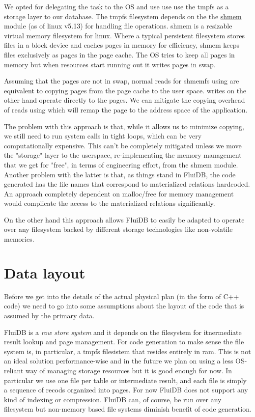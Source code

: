 We opted for delegating the task to the OS and use use use the tmpfs
as a storage layer to our database. The tmpfs filesystem depends on
the the
\href{https://elixir.bootlin.com/linux/latest/source/mm/shmem.c}{shmem}
module (as of linux v5.13) for handling file operations. shmem is a
resizable virtual memory filesystem for linux. Where a typical
persistent filesystem stores files in a block device and caches pages
in memory for efficiency, shmem keeps files exclusively as pages in
the page cache. The OS tries to keep all pages in memory but when
resources start running out it writes pages in swap.

Assuming that the pages are not in swap, normal reads for shmemfs
using  are equivalent to copying pages from the page cache to
the user space.  writes on the other hand operate directly to
the pages. We can mitigate the copying overhead of reads using 
which will remap the page to the address space of the application.

The problem with this approach is that, while it allows us to minimize
copying, we still need to run system calls in tight loops, which can
be very computationally expensive. This can't be completely mitigated
unless we move the "storage" layer to the userspace, re-implementing
the memory management that we get for "free", in terms of engineering
effort, from the shmem module. Another problem with the latter is
that, as things stand in FluiDB, the code generated has the file names
that correspond to materialized relations hardcoded. An approach
completely dependent on malloc/free for memory management would
complicate the access to the materialized relations significantly.

On the other hand this approach allows FluiDB to easily be adapted to
operate over any filesystem backed by different storage technologies
like non-volatile memories.

\section{Data layout}

Before we get into the details of the actual physical plan (in the
form of C++ code) we need to go into some assumptions about the layout
of the code that is assumed by the primary data.

FluiDB is a \emph{row store system} and it depends on the filesystem for
itnermediate result lookup and page management. For code generation to
make sense the file system is, in particular, a tmpfs filesistem that
resides entirely in ram. This is not an ideal solution
performance-wise and in the future we plan on using a less OS-reliant
way of managing storage resources but it is good enough for now. In
particular we use one file per table or intermediate result, and each
file is simply a sequence of recods organized into pages. For now
FluiDB does not support any kind of indexing or compression. FluiDB
can, of course, be run over any filesystem but non-memory based file
systems diminish benefit of code generation.

